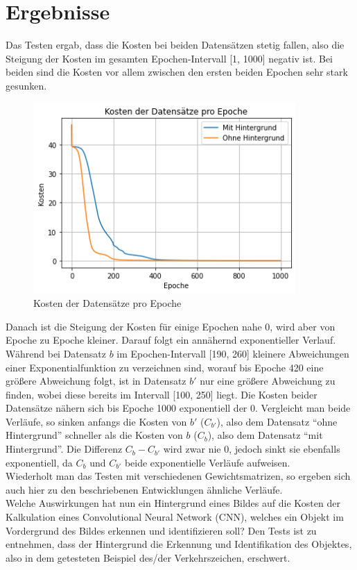 \documentclass[paper=A4,pagesize=auto,12pt,headinclude=true,footinclude=true,BCOR=0mm,DIV=calc]{scrartcl}
\begin{document}
\section{Ergebnisse}
Das Testen ergab, dass die Kosten bei beiden Datensätzen stetig fallen, also die Steigung der Kosten im gesamten Epochen-Intervall [1, 1000] negativ ist. Bei beiden sind die Kosten vor allem zwischen den ersten beiden Epochen sehr stark gesunken. 
\begin{figure}
	\centering
	\includegraphics[width=10cm]{"images/test_plot.png"}
	\caption{Kosten der Datensätze pro Epoche}
	\label{testplot1}
\end{figure}
Danach ist die Steigung der Kosten für einige Epochen nahe 0, wird aber von Epoche zu Epoche kleiner. Darauf folgt ein annähernd exponentieller Verlauf. Während bei Datensatz $b$ im Epochen-Intervall [190, 260] kleinere Abweichungen einer Exponentialfunktion zu verzeichnen sind, worauf bis Epoche 420 eine größere Abweichung folgt, ist in Datensatz $b'$ nur eine größere Abweichung zu finden, wobei diese bereits im Intervall [100, 250] liegt. Die Kosten beider Datensätze nähern sich bis Epoche 1000 exponentiell der 0. Vergleicht man beide Verläufe, so sinken anfangs die Kosten von $b'$ ($C_{b'}$), also dem Datensatz ``ohne Hintergrund'' schneller als die Kosten von $b$ ($C_{b}$), also dem Datensatz ``mit Hintergrund''. Die Differenz $C_{b}-C_{b'}$ wird zwar nie 0, jedoch sinkt sie ebenfalls exponentiell, da $C_{b}$ und $C_{b'}$ beide exponentielle Verläufe aufweisen. \\
Wiederholt man das Testen mit verschiedenen Gewichtsmatrizen, so ergeben sich auch hier zu den beschriebenen Entwicklungen ähnliche Verläufe. \\
Welche Auswirkungen hat nun ein Hintergrund eines Bildes auf die Kosten der Kalkulation eines Convolutional Neural Network (CNN), welches ein Objekt im Vordergrund des Bildes erkennen und identifizieren soll? Den Tests ist zu entnehmen, dass der Hintergrund die Erkennung und Identifikation des Objektes, also in dem getesteten Beispiel des/der Verkehrszeichen, erschwert.
\end{document}
